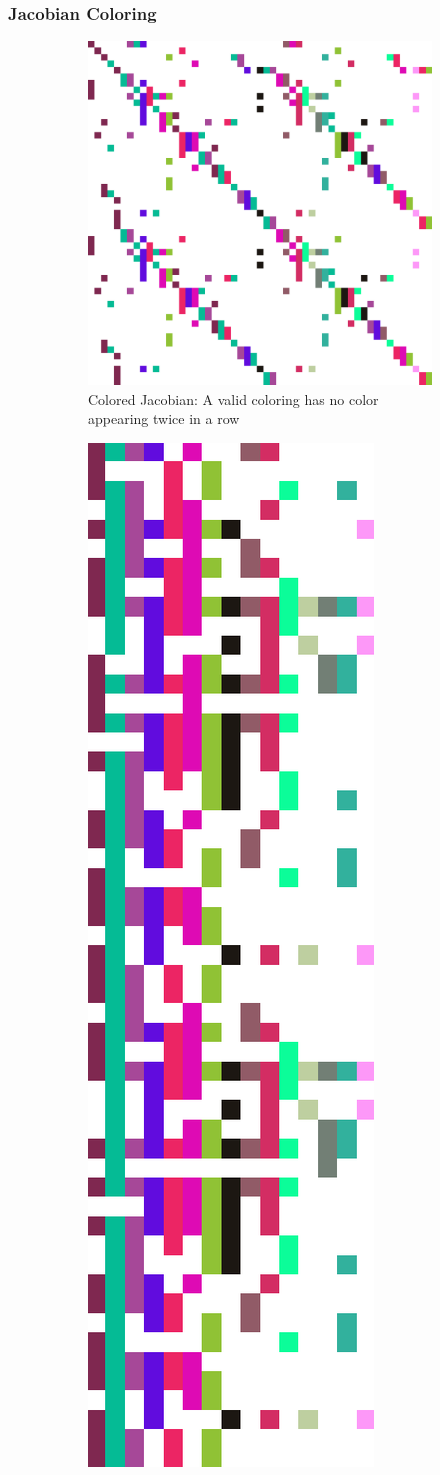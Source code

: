 \begin{frame}
  \frametitle{Jacobian Coloring}
    \begin{figure}
\centering
     \begin{subfigure}[b]{0.35\linewidth}
         \centering
         \includegraphics[height=\textwidth]{figures/sparse_coloring.PNG}
         \caption{Colored Jacobian: A valid coloring has no color appearing twice in a row}
     \end{subfigure}
     \hspace{0.05\linewidth}
     \begin{subfigure}[b]{0.35\linewidth}
         \centering
         \includegraphics[height=\linewidth]{figures/compressed_coloring.PNG}

\end{subfigure}
\end{figure}
\end{frame}
